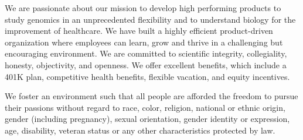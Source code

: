 \par We are passionate about our mission to develop high performing products to study genomics in an unprecedented flexibility and to understand biology for the improvement of healthcare. We have built a highly efficient product-driven organization where employees can learn, grow and thrive in a challenging but encouraging environment. We are committed to scientific integrity, collegiality, honesty, objectivity, and openness. We offer excellent benefits, which include a 401K plan, competitive health benefits, flexible vacation, and equity incentives.
\par We foster an environment such that all people are afforded the freedom to pursue their passions without regard to race, color, religion, national or ethnic origin, gender (including pregnancy), sexual orientation, gender identity or expression, age, disability, veteran status or any other characteristics protected by law.

\bye
